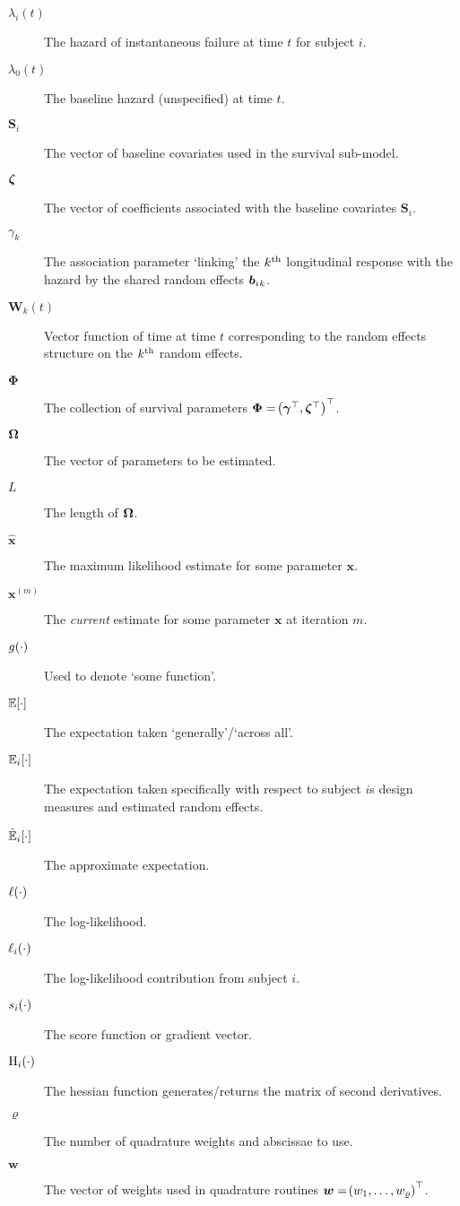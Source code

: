 \begin{small}
\begin{multicols}{2}
\begin{description}
    \item[$\lambda_i(t)$] The hazard of instantaneous failure at time $t$ for subject $i$.
    \item[$\lambda_0(t)$] The baseline hazard (unspecified) at time $t$.
    \item[$\bm{S}_i$] The vector of baseline covariates used in the survival sub-model.
    \item[$\bm{\zeta}$] The vector of coefficients associated with the baseline covariates $\bm{S}_i$.
    \item[$\gamma_k$] The association parameter `linking' the $k^{\text{th}}$ longitudinal response with the hazard by the shared random effects $\bm{b}_i{_k}$.
    \item[$\bm{W}_k(t)$] Vector function of time at time $t$ corresponding to the random effects structure on the $k^{\text{th}}$ random effects.
    \item[$\bm{\Phi}$] The collection of survival parameters $\bm{\Phi}=\!\left(\bm{\gamma}^\top,\bm{\zeta}^\top\right)^\top$.
    \item[$\bm{\mathrm{\Omega}}$] The vector of parameters to be estimated.
    \item[$L$] The length of $\bm{\mathrm{\Omega}}$. 
    \item[$\hat{\bm{x}}$] The maximum likelihood estimate for some parameter $\bm{x}$.
    \item[$\bm{x}^{(m)}$] The \textit{current} estimate for some parameter $\bm{x}$ at iteration $m$.
    \item[$g\!\left(\cdot\right)$] Used to denote `some function'.
    \item[$\mathbb{E}\!\left[\cdot\right]$] The expectation taken `generally'/`across all'.
    \item[$\mathbb{E}_i\!\left[\cdot\right]$] The expectation taken specifically with respect to subject $i$s design measures and estimated random effects.
    \item[$\tilde{\mathbb{E}}_i\!\left[\cdot\right]$] The approximate expectation.
    \item[$\ell\!\left(\cdot\right)$] The log-likelihood. 
    \item[$\ell_i\!\left(\cdot\right)$] The log-likelihood contribution from subject $i$. 
    \item[$s_i\!\left(\cdot\right)$] The score function or gradient vector.
    \item[$\mathrm{H}_i\!\left(\cdot\right)$] The hessian function \ie generates/returns the matrix of second derivatives.
    \item[$\varrho$] The number of quadrature weights and abscissae to use.
    \item[$\bm{w}$] The vector of weights used in quadrature routines $\bm{w}=\!\left( w_1,\dots,w_\varrho\right)^\top$.

\end{description}
\end{multicols}
\end{small}
